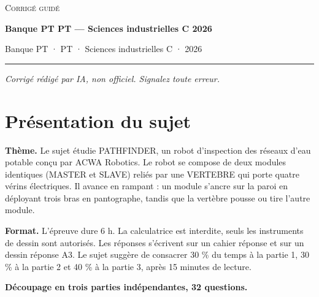 \documentclass[11pt,a4paper]{article}
\begin{document}
\thispagestyle{plain}
\begin{center}
  {\small\scshape Corrigé guidé}\par\smallskip
  {\LARGE\bfseries Banque PT PT — Sciences industrielles C 2026\par}\medskip
  {\large Banque PT · PT · Sciences industrielles C · 2026\par}
\end{center}
\vspace{2pt}\hrule\vspace{8pt}

\emph{Corrigé rédigé par IA, non officiel. Signalez toute erreur.}

\hypertarget{pruxe9sentation-du-sujet}{%
\section{Présentation du sujet}\label{pruxe9sentation-du-sujet}}

\textbf{Thème.} Le sujet étudie PATHFINDER, un robot d'inspection des réseaux d'eau potable conçu par ACWA Robotics. Le robot se compose de deux modules identiques (MASTER et SLAVE) reliés par une VERTEBRE qui porte quatre vérins électriques. Il avance en rampant : un module s'ancre sur la paroi en déployant trois bras en pantographe, tandis que la vertèbre pousse ou tire l'autre module.

\textbf{Format.} L'épreuve dure 6 h. La calculatrice est interdite, seuls les instruments de dessin sont autorisés. Les réponses s'écrivent sur un cahier réponse et sur un dessin réponse A3. Le sujet suggère de consacrer 30 \% du temps à la partie 1, 30 \% à la partie 2 et 40 \% à la partie 3, après 15 minutes de lecture.

\textbf{Découpage en trois parties indépendantes, 32 questions.}
\end{document}
